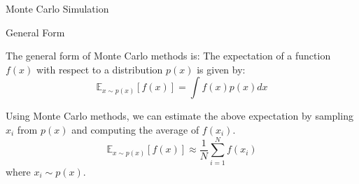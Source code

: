 \documentclass{beamer}
\begin{document}
\begin{section}{Monte Carlo Simulation}

    \begin{frame}{General Form}

        The general form of Monte Carlo methods is:
        The expectation of a function $f(x)$ with respect to a distribution $p(x)$ is given by:
        \pause \begin{equation}
            \mathbb{E}_{x \sim p(x)}[f(x)] = \int f(x) p(x) dx
        \end{equation}
        
        \pause Using Monte Carlo methods, we can estimate the above expectation by sampling $x_i$ from $p(x)$ and computing the average of $f(x_i)$.
        \pause \begin{equation}
            \mathbb{E}_{x \sim p(x)}[f(x)] \approx \frac{1}{N} \sum_{i=1}^{N} f(x_i)
        \end{equation}
        where $x_i \sim p(x)$.

    \end{frame}

        

\end{section}
\end{document}

